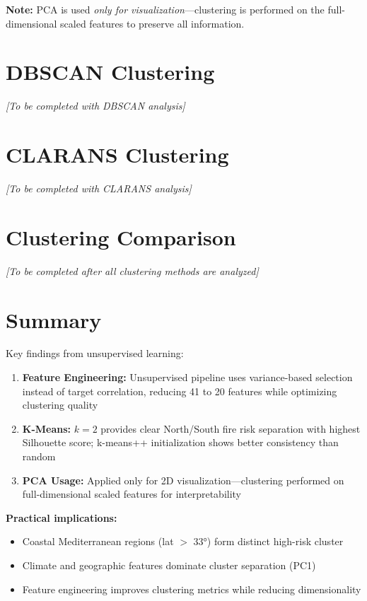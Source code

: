 \textbf{Note:} PCA is used \textit{only for visualization}---clustering is performed on the full-dimensional scaled features to preserve all information.

\section{DBSCAN Clustering}

\textit{[To be completed with DBSCAN analysis]}

\section{CLARANS Clustering}

\textit{[To be completed with CLARANS analysis]}

\section{Clustering Comparison}

\textit{[To be completed after all clustering methods are analyzed]}

\section{Summary}
Key findings from unsupervised learning:
\begin{enumerate}
    \item \textbf{Feature Engineering:} Unsupervised pipeline uses variance-based selection instead of target correlation, reducing 41 to 20 features while optimizing clustering quality
    \item \textbf{K-Means:} $k=2$ provides clear North/South fire risk separation with highest Silhouette score; k-means++ initialization shows better consistency than random
    \item \textbf{PCA Usage:} Applied only for 2D visualization---clustering performed on full-dimensional scaled features for interpretability
\end{enumerate}

\textbf{Practical implications:}
\begin{itemize}
    \item Coastal Mediterranean regions (lat $>$ 33°) form distinct high-risk cluster
    \item Climate and geographic features dominate cluster separation (PC1)
    \item Feature engineering improves clustering metrics while reducing dimensionality
\end{itemize}
